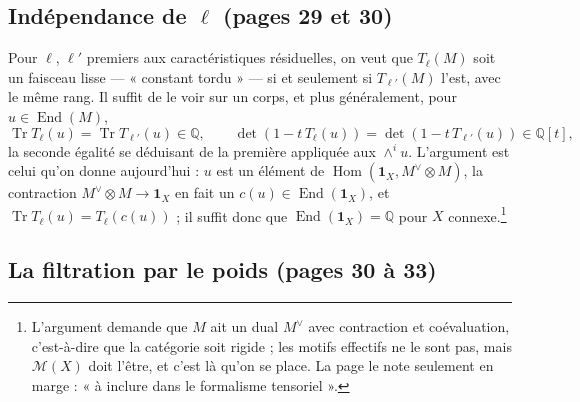 \documentclass[11pt,a4paper]{article}
\begin{document}
\subsection*{Indépendance de $\ell$ (pages 29 et 30)}

Pour $\ell$, $\ell'$ premiers aux caractéristiques résiduelles, on veut que
$T_{\ell}(M)$ soit un faisceau lisse --- « constant tordu » --- si et seulement
si $T_{\ell'}(M)$ l'est, avec le même rang. Il suffit de le voir sur un corps, et
plus généralement, pour $u \in \operatorname{End}(M)$,
\[
\operatorname{Tr} T_{\ell}(u) = \operatorname{Tr} T_{\ell'}(u) \in \mathbb{Q} ,
\qquad
\det(1 - t\,T_{\ell}(u)) = \det(1 - t\,T_{\ell'}(u)) \in \mathbb{Q}[t] ,
\]
la seconde égalité se déduisant de la première appliquée aux $\wedge^{i}u$.
L'argument est celui qu'on donne aujourd'hui : $u$ est un élément de
$\operatorname{Hom}(\mathbf{1}_{X}, M^{\vee} \otimes M)$, la contraction
$M^{\vee} \otimes M \to \mathbf{1}_{X}$ en fait un $c(u) \in
\operatorname{End}(\mathbf{1}_{X})$, et $\operatorname{Tr} T_{\ell}(u) =
T_{\ell}(c(u))$ ; il suffit donc que $\operatorname{End}(\mathbf{1}_{X}) =
\mathbb{Q}$ pour $X$ connexe.\footnote{L'argument demande que $M$ ait un dual
$M^{\vee}$ avec contraction et coévaluation, c'est-à-dire que la catégorie soit
rigide ; les motifs effectifs ne le sont pas, mais $\mathcal{M}(X)$ doit l'être,
et c'est là qu'on se place. La page le note seulement en marge : « à inclure
dans le formalisme tensoriel ».}

\subsection*{La filtration par le poids (pages 30 à 33)}
\end{document}
